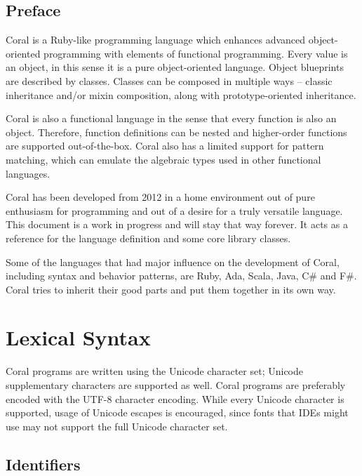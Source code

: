 
\section*{Preface}

Coral is a Ruby-like programming language which enhances advanced object-oriented programming with elements of functional programming. Every value is an object, in this sense it is a pure object-oriented language. Object blueprints are described by classes. Classes can be composed in multiple ways – classic inheritance and/or mixin composition, along with prototype-oriented inheritance.

Coral is also a functional language in the sense that every function is also an object. Therefore, function definitions can be nested and higher-order functions are supported out-of-the-box. Coral also has a limited support for pattern matching, which can emulate the algebraic types used in other functional languages.

Coral has been developed from 2012 in a home environment out of pure enthusiasm for programming and out of a desire for a truly versatile language. This document is a work in progress and will stay that way forever. It acts as a reference for the language definition and some core library classes.

Some of the languages that had major influence on the development of Coral, including syntax and behavior patterns, are Ruby, Ada, Scala, Java, C\# and F\#. Coral tries to inherit their good parts and put them together in its own way.

\chapter{Lexical Syntax}

Coral programs are written using the Unicode character set; Unicode supplementary characters are supported as well. Coral programs are preferably encoded with the UTF-8 character encoding. While every Unicode character is supported, usage of Unicode escapes is encouraged, since fonts that IDEs might use may not support the full Unicode character set.

\newpage

\section{Identifiers}\label{sec:identifiers}

